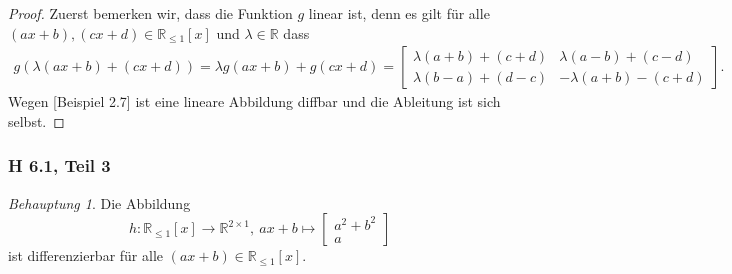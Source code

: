 \documentclass[draft,a5paper]{article}
\theoremstyle{remark}
\newtheorem*{beh}{Behauptung}
\begin{document}
\begin{proof}
  Zuerst bemerken wir, dass die Funktion \(g\) linear ist, denn es
  gilt für alle \((ax+b), (cx+d) \in \mathbb{R}_{\le 1}[x]\) und \(\lambda \in \mathbb{R}\) dass
  \begin{align*}
    g(\lambda(ax+b)+(cx+d)) = \lambda g(ax+b) + g(cx + d) =
    \begin{bmatrix}
      \lambda(a+b) + (c+d) & \lambda(a-b) + (c-d) \\
      \lambda(b-a) + (d-c) & -\lambda(a+b) - (c+d)
    \end{bmatrix}.
  \end{align*}
  Wegen [Beispiel 2.7] ist eine lineare Abbildung diffbar und die
  Ableitung ist sich selbst.
\end{proof}

\subsubsection*{H 6.1, Teil 3}

\begin{beh}
  Die Abbildung
  \[h\colon \mathbb{R}_{\le 1}[x] \to \mathbb{R}^{2 \times 1},~ ax+b \mapsto
    \begin{bmatrix}
      a^{2} + b^{2} \\
      a
    \end{bmatrix}
  \] ist differenzierbar für alle
  \((ax+b) \in \mathbb{R}_{\le 1}[x]\).
\end{beh}
\end{document}
